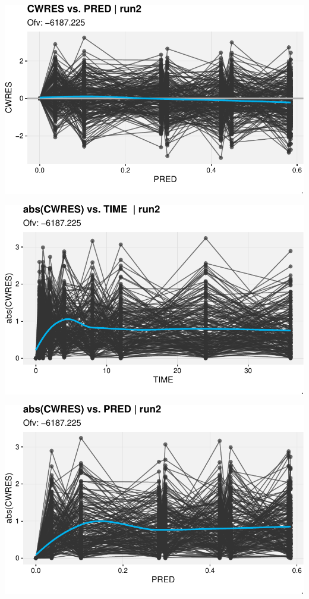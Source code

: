 \documentclass[
  letterpaper,
  toc=chapterentrywithdots,
  11pt,
  headings=small]{scrreprt}
\begin{document}
\includegraphics{sec/results_files/figure-pdf/unnamed-chunk-4-8.pdf}

\includegraphics{sec/results_files/figure-pdf/unnamed-chunk-4-9.pdf}

\includegraphics{sec/results_files/figure-pdf/unnamed-chunk-4-10.pdf}
\end{document}
